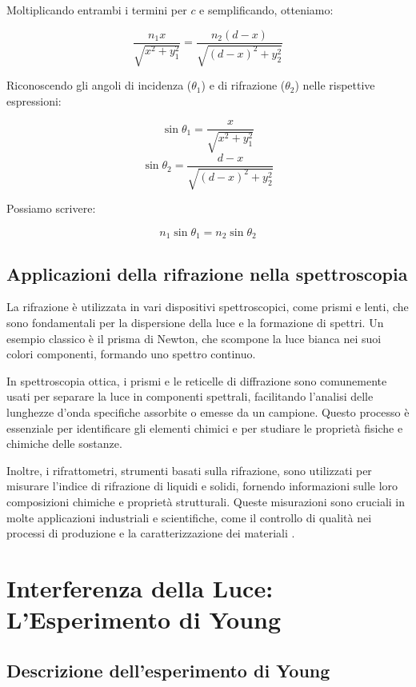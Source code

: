 \documentclass[12pt,a4paper]{report}
\begin{document}
Moltiplicando entrambi i termini per \( c \) e semplificando, otteniamo:

\[ \frac{n_1 x}{\sqrt{x^2 + y_1^2}} = \frac{n_2 (d - x)}{\sqrt{(d - x)^2 + y_2^2}} \]

Riconoscendo gli angoli di incidenza (\( \theta_1 \)) e di rifrazione (\( \theta_2 \)) nelle rispettive espressioni:

\[ \sin \theta_1 = \frac{x}{\sqrt{x^2 + y_1^2}} \]
\[ \sin \theta_2 = \frac{d - x}{\sqrt{(d - x)^2 + y_2^2}} \]

Possiamo scrivere:

\[ n_1 \sin \theta_1 = n_2 \sin \theta_2 \]

\subsection{Applicazioni della rifrazione nella spettroscopia}

La rifrazione è utilizzata in vari dispositivi spettroscopici, come prismi e lenti, che sono fondamentali per la dispersione della luce e la formazione di spettri. Un esempio classico è il prisma di Newton, che scompone la luce bianca nei suoi colori componenti, formando uno spettro continuo.

In spettroscopia ottica, i prismi e le reticelle di diffrazione sono comunemente usati per separare la luce in componenti spettrali, facilitando l'analisi delle lunghezze d'onda specifiche assorbite o emesse da un campione. Questo processo è essenziale per identificare gli elementi chimici e per studiare le proprietà fisiche e chimiche delle sostanze.

Inoltre, i rifrattometri, strumenti basati sulla rifrazione, sono utilizzati per misurare l'indice di rifrazione di liquidi e solidi, fornendo informazioni sulle loro composizioni chimiche e proprietà strutturali. Queste misurazioni sono cruciali in molte applicazioni industriali e scientifiche, come il controllo di qualità nei processi di produzione e la caratterizzazione dei materiali \cite{hecht2002optics}.

\section{Interferenza della Luce: L'Esperimento di Young}

\subsection{Descrizione dell'esperimento di Young}
\end{document}

